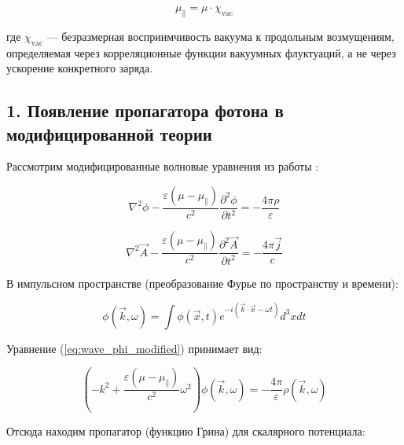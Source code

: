 \documentclass[12pt, a4paper]{article}
\begin{document}


\begin{equation}
\mu_{\parallel} = \mu \cdot \chi_{\text{vac}}
\label{eq:mu_correct}
\end{equation}

где $\chi_{\text{vac}}$ — безразмерная восприимчивость вакуума к продольным возмущениям, определяемая через корреляционные функции вакуумных флуктуаций, а не через ускорение конкретного заряда.

\subsection{1. Появление пропагатора фотона в модифицированной теории}

Рассмотрим модифицированные волновые уравнения из работы \cite{NikolaevLorentz}:

\begin{equation}
\nabla^2 \phi - \frac{\varepsilon(\mu - \mu_{\parallel})}{c^2} \frac{\partial^2 \phi}{\partial t^2} = -\frac{4\pi\rho}{\varepsilon}
\label{eq:wave_phi_modified}
\end{equation}

\begin{equation}
\nabla^2 \vec{A} - \frac{\varepsilon(\mu - \mu_{\parallel})}{c^2} \frac{\partial^2 \vec{A}}{\partial t^2} = -\frac{4\pi\vec{j}}{c}
\label{eq:wave_A_modified}
\end{equation}

В импульсном пространстве (преобразование Фурье по пространству и времени):

\begin{equation}
\phi(\vec{k}, \omega) = \int \phi(\vec{x}, t) e^{-i(\vec{k}\cdot\vec{x} - \omega t)} d^3x dt
\end{equation}

Уравнение (\ref{eq:wave_phi_modified}) принимает вид:

\begin{equation}
\left(-k^2 + \frac{\varepsilon(\mu - \mu_{\parallel})}{c^2}\omega^2\right) \phi(\vec{k}, \omega) = -\frac{4\pi}{\varepsilon}\rho(\vec{k}, \omega)
\end{equation}

Отсюда находим пропагатор (функцию Грина) для скалярного потенциала:
\end{document}
